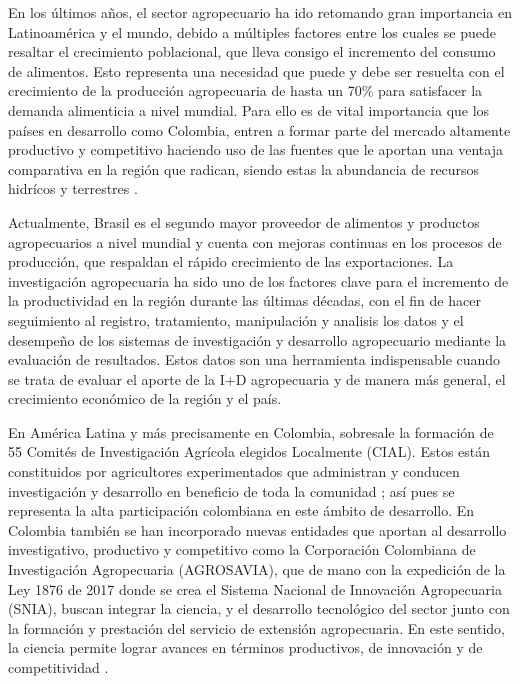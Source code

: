 
En los últimos años, el sector agropecuario ha ido retomando gran importancia en Latinoamérica y el mundo, debido a múltiples factores entre los cuales se puede resaltar el crecimiento poblacional, que lleva consigo el incremento del consumo de alimentos. Esto representa una necesidad que puede y debe ser resuelta con el crecimiento de la producción agropecuaria de hasta un 70\% para satisfacer la demanda alimenticia a nivel mundial. Para ello es de vital importancia que los países en desarrollo como Colombia, entren a formar parte del mercado altamente productivo y competitivo haciendo uso de las fuentes que le aportan una ventaja comparativa en la región que radican, siendo estas la abundancia de recursos hidrícos y terrestres \cite{fao}.

Actualmente, Brasil es el segundo mayor proveedor de alimentos y productos agropecuarios a nivel mundial y cuenta con mejoras continuas en los procesos de producción, que respaldan el rápido crecimiento de las exportaciones. La investigación agropecuaria ha sido uno de los factores clave para el incremento de la productividad en la región durante las últimas décadas, con el fin de hacer seguimiento al registro, tratamiento, manipulación y analisis  los datos y el desempeño de los sistemas de investigación y desarrollo agropecuario mediante la evaluación de resultados. Estos datos son una herramienta indispensable cuando se trata de evaluar el aporte de la I+D agropecuaria y de manera más general, el crecimiento económico de la región y el país.

En América Latina y más precisamente en Colombia, sobresale la formación de 55 Comités de Investigación Agrícola elegidos Localmente (CIAL). Estos están constituidos por agricultores experimentados que administran y conducen investigación y desarrollo en beneficio de toda la comunidad \cite{ashby}; así pues se representa la alta participación colombiana en este ámbito de desarrollo. En Colombia también se han incorporado nuevas entidades que aportan al desarrollo investigativo, productivo y competitivo como la Corporación Colombiana de Investigación Agropecuaria (AGROSAVIA), que de mano con la expedición de la Ley 1876 de 2017 donde se crea el Sistema Nacional de Innovación Agropecuaria (SNIA), buscan integrar la ciencia, y el desarrollo tecnológico del sector junto con la formación y prestación del servicio de extensión agropecuaria. En este sentido, la ciencia permite lograr avances en términos productivos, de innovación y de competitividad \cite{minagricultura}.

